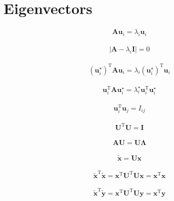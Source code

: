 \documentclass{article}
\begin{document}
\section{Eigenvectors}

\begin{align*}
\mathbf{A} \mathbf{u}_{i} = \lambda_{i} \mathbf{u}_{i}
\tag{A.29}
\end{align*}

\begin{align*}
\left|\mathbf{A} - \lambda_{i} \mathbf{I}\right| = 0
\tag{A.30}
\end{align*}

\begin{align*}
\left(\mathbf{u}_{i}^{\star}\right)^{\mathrm{T}} \mathbf{A} \mathbf{u}_{i} = \lambda_{i}\left(\mathbf{u}_{i}^{\star}\right)^{\mathrm{T}} \mathbf{u}_{i}
\tag{A.31}
\end{align*}

\begin{align*}
\mathbf{u}_{i}^{\mathrm{T}} \mathbf{A} \mathbf{u}_{i}^{\star} = \lambda_{i}^{\star} \mathbf{u}_{i}^{\mathrm{T}} \mathbf{u}_{i}^{\star}
\tag{A.32}
\end{align*}

\begin{align*}
\mathbf{u}_{i}^{\mathrm{T}} \mathbf{u}_{j} = I_{i j}
\tag{A.33}
\end{align*}

\begin{align*}
\mathbf{U}^{\mathrm{T}} \mathbf{U} = \mathbf{I}
\tag{A.37}
\end{align*}

\begin{align*}
\mathbf{A U} = \mathbf{U} \boldsymbol{\Lambda}
\tag{A.38}
\end{align*}

\begin{align*}
\widetilde{\mathbf{x}} = \mathbf{U x}
\tag{A.39}
\end{align*}

\begin{align*}
\widetilde{\mathbf{x}}^{\mathrm{T}} \widetilde{\mathbf{x}} = \mathbf{x}^{\mathrm{T}} \mathbf{U}^{\mathrm{T}} \mathbf{U} \mathbf{x} = \mathbf{x}^{\mathrm{T}} \mathbf{x}
\tag{A.40}
\end{align*}

\begin{align*}
\widetilde{\mathbf{x}}^{\mathrm{T}} \widetilde{\mathbf{y}} = \mathbf{x}^{\mathrm{T}} \mathbf{U}^{\mathrm{T}} \mathbf{U} \mathbf{y} = \mathbf{x}^{\mathrm{T}} \mathbf{y}
\tag{A.41}
\end{align*}
\end{document}

